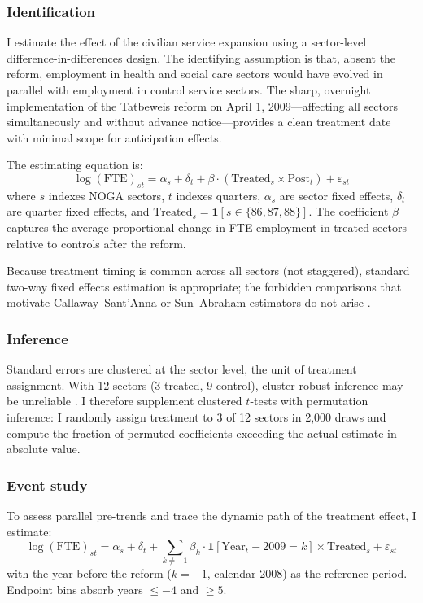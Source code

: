 \documentclass[12pt]{article}
\begin{document}
\subsubsection*{Identification} I estimate the effect of the civilian service expansion using a sector-level difference-in-differences design. The identifying assumption is that, absent the reform, employment in health and social care sectors would have evolved in parallel with employment in control service sectors. The sharp, overnight implementation of the Tatbeweis reform on April 1, 2009---affecting all sectors simultaneously and without advance notice---provides a clean treatment date with minimal scope for anticipation effects.

The estimating equation is:
\begin{equation}
\log(\text{FTE})_{st} = \alpha_s + \delta_t + \beta \cdot (\text{Treated}_s \times \text{Post}_t) + \varepsilon_{st}
\label{eq:did}
\end{equation}
where $s$ indexes NOGA sectors, $t$ indexes quarters, $\alpha_s$ are sector fixed effects, $\delta_t$ are quarter fixed effects, and $\text{Treated}_s = \mathbf{1}[s \in \{86, 87, 88\}]$. The coefficient $\beta$ captures the average proportional change in FTE employment in treated sectors relative to controls after the reform.

Because treatment timing is common across all sectors (not staggered), standard two-way fixed effects estimation is appropriate; the forbidden comparisons that motivate Callaway--Sant'Anna or Sun--Abraham estimators do not arise \citep{callaway2021difference, sun2021estimating, goodman2021difference}.

\subsubsection*{Inference} Standard errors are clustered at the sector level, the unit of treatment assignment. With 12 sectors (3 treated, 9 control), cluster-robust inference may be unreliable \citep{cameron2008bootstrap}. I therefore supplement clustered $t$-tests with permutation inference: I randomly assign treatment to 3 of 12 sectors in 2,000 draws and compute the fraction of permuted coefficients exceeding the actual estimate in absolute value.

\subsubsection*{Event study} To assess parallel pre-trends and trace the dynamic path of the treatment effect, I estimate:
\begin{equation}
\log(\text{FTE})_{st} = \alpha_s + \delta_t + \sum_{k \neq -1} \beta_k \cdot \mathbf{1}[\text{Year}_t - 2009 = k] \times \text{Treated}_s + \varepsilon_{st}
\label{eq:eventstudy}
\end{equation}
with the year before the reform ($k = -1$, calendar 2008) as the reference period. Endpoint bins absorb years $\leq -4$ and $\geq 5$.
\end{document}
